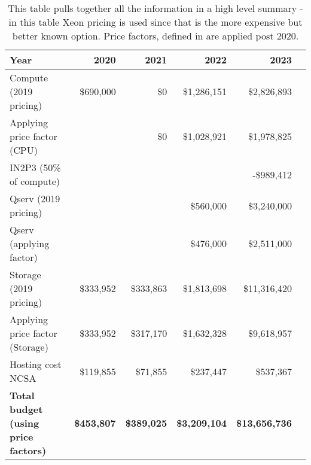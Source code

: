 \tiny \begin{longtable} { |p{}  |r  |r  |r  |r  |r |} 
\caption{This table pulls together all the information in a high level summary - in this table Xeon pricing is used since that is the more expensive but better known option. Price factors, defined in  are applied post 2020.
 \label{tab:Summary}}\\ 
\hline 
\textbf{Year}&\textbf{2020}&\textbf{2021}&\textbf{2022}&\textbf{2023} \\ \hline
{Compute (2019 pricing)}&{\$690,000}&{\$0}&{\$1,286,151}&{\$2,826,893} \\ \hline
{Applying price factor (CPU)}&{}&{\$0}&{\$1,028,921}&{\$1,978,825} \\ \hline
{IN2P3 (50\% of compute)}&{}&{}&{}&{-\$989,412} \\ \hline
{Qserv (2019 pricing)}&{}&{}&{\$560,000}&{\$3,240,000} \\ \hline
{Qserv (applying factor)}&{}&{}&{\$476,000}&{\$2,511,000} \\ \hline
{Storage (2019 pricing)}&{\$333,952}&{\$333,863}&{\$1,813,698}&{\$11,316,420} \\ \hline
{Applying price factor (Storage)}&{\$333,952}&{\$317,170}&{\$1,632,328}&{\$9,618,957} \\ \hline
{Hosting cost NCSA
}&{\$119,855}&{\$71,855}&{\$237,447}&{\$537,367} \\ \hline
\textbf{Total budget (using price factors)}&\textbf{\$453,807}&\textbf{\$389,025}&\textbf{\$3,209,104}&\textbf{\$13,656,736} \\ \hline
\end{longtable} \normalsize
